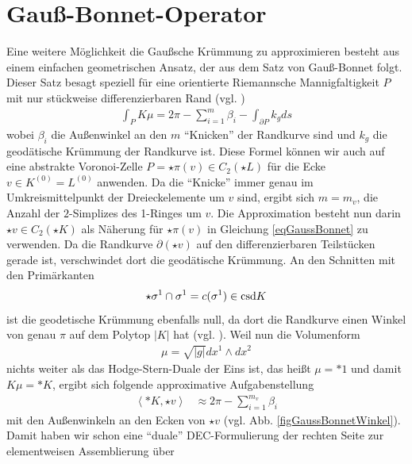 \section{Gauß-Bonnet-Operator}
  Eine weitere Möglichkeit die Gaußsche Krümmung zu approximieren besteht aus einem einfachen geometrischen Ansatz, der aus dem Satz von
  Gauß-Bonnet folgt. 
  Dieser Satz besagt speziell für eine orientierte Riemannsche Mannigfaltigkeit \( P \) mit nur stückweise differenzierbaren Rand (vgl.
  \cite[Kap.10.5]{berger})
  \begin{align}
    \label{eqGaussBonnet}
    \int_{P}K \mu = 2\pi - \sum_{i=1}^{m}\beta_{i} - \int_{\partial P} k_{g} ds
  \end{align}
  wobei \( \beta_{i} \) die Außenwinkel an den \( m \) "`Knicken"' der Randkurve sind und \( k_{g} \) die geodätische Krümmung der
  Randkurve ist.
  Diese Formel können wir auch auf eine abstrakte Voronoi-Zelle \( P=\star\pi(v)\in C_{2}(\star L) \) für die Ecke \( v \in K^{(0)}=L^{(0)} \)
  anwenden. 
  Da die "`Knicke"' immer genau im Umkreismittelpunkt der Dreieckelemente um \( v \) sind, 
  ergibt sich \( m=m_{v} \), die Anzahl der \( 2 \)-Simplizes des 1-Ringes um \( v \).
  Die Approximation besteht nun darin \mbox{\( \star v \in C_{2}(\star K) \)} als Näherung für \( \star\pi(v) \) in Gleichung \eqref{eqGaussBonnet}
  zu verwenden.
  Da die Randkurve \( \partial(\star v) \) auf den differenzierbaren Teilstücken gerade ist, verschwindet dort die geodätische Krümmung.
  An den Schnitten mit den Primärkanten 
  \begin{align}
    \star\sigma^{1}\cap\sigma^{1} = c(\sigma^{1})\in \text{csd} K 
  \end{align}
  ist die 
  geodetische Krümmung ebenfalls null,
  da dort die Randkurve einen Winkel von genau \( \pi \) auf dem Polytop \( |K| \) hat (vgl. \cite{polthier}).
  Weil nun die Volumenform 
  \begin{align}
    \mu = \sqrt{|g|} dx^{1} \wedge dx^{2}
  \end{align}
  nichts weiter als das Hodge-Stern-Duale der Eins ist, das heißt 
  \( \mu = *1 \) und damit \mbox{\(  K \mu = *K \)}, ergibt sich folgende approximative Aufgabenstellung
  \begin{align}
      \label{eqDualGaussBonnet}
      \left\langle *K , \star v \right\rangle &\approx 2\pi - \sum_{i=1}^{m_{v}}\beta_{i}
  \end{align}
  mit den Außenwinkeln an den Ecken von \( \star v \) (vgl. Abb. \ref{figGaussBonnetWinkel}).
  Damit haben wir schon eine "`duale"' DEC-Formulierung der rechten Seite zur elementweisen Assemblierung über
